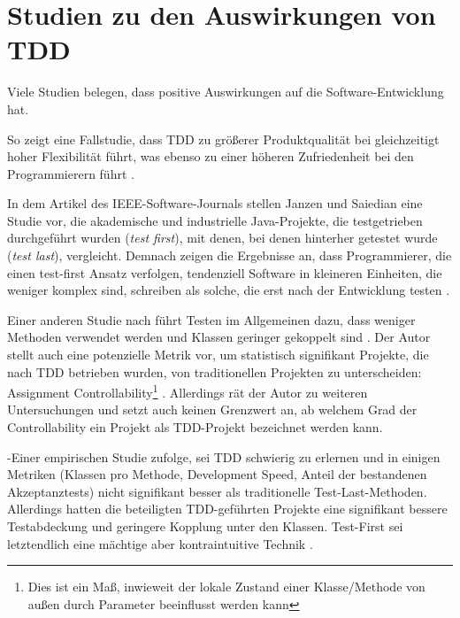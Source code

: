\section{Studien zu den Auswirkungen von TDD}

Viele Studien belegen, dass  positive Auswirkungen auf die Software-Entwicklung hat.


So zeigt eine Fallstudie, dass TDD zu größerer Produktqualität bei gleichzeitigt hoher Flexibilität führt, was ebenso zu einer höheren Zufriedenheit bei den Programmierern führt \citep{hans_wasmus_evaluation_2007}.




In dem Artikel des IEEE-Software-Journals stellen Janzen und Saiedian eine Studie vor, die akademische und industrielle Java-Projekte, die testgetrieben durchgeführt wurden (\textit{test first}), mit denen, bei denen hinterher getestet wurde (\textit{test last}), vergleicht. Demnach zeigen die Ergebnisse an, dass Programmierer, die einen test-first Ansatz verfolgen, tendenziell Software in kleineren Einheiten, die weniger komplex sind, schreiben als solche, die erst nach der Entwicklung testen \citep{janzen_does_2008}.


Einer anderen Studie nach führt Testen im Allgemeinen dazu, dass weniger Methoden verwendet werden und Klassen geringer gekoppelt sind \cite{mueller_effect_2006}. Der Autor stellt auch eine potenzielle Metrik vor, um statistisch signifikant Projekte, die nach TDD betrieben wurden, von traditionellen Projekten zu unterscheiden: Assignment Controllability\footnote{Dies ist ein Maß, inwieweit der lokale Zustand einer Klasse/Methode von außen durch Parameter beeinflusst werden kann} \cite{mueller_effect_2006}. Allerdings rät der Autor zu weiteren Untersuchungen und setzt auch keinen Grenzwert an, ab welchem Grad der Controllability ein Projekt als TDD-Projekt bezeichnet werden kann.

-Einer empirischen Studie zufolge, sei TDD schwierig zu erlernen und in einigen Metriken (Klassen pro Methode, Development Speed, Anteil der bestandenen Akzeptanztests) nicht signifikant besser als traditionelle Test-Last-Methoden. Allerdings hatten die beteiligten TDD-geführten Projekte eine signifikant bessere Testabdeckung und geringere Kopplung unter den Klassen. Test-First sei letztendlich eine mächtige aber kontraintuitive Technik \citep{madeyski_test-driven_2009}.

